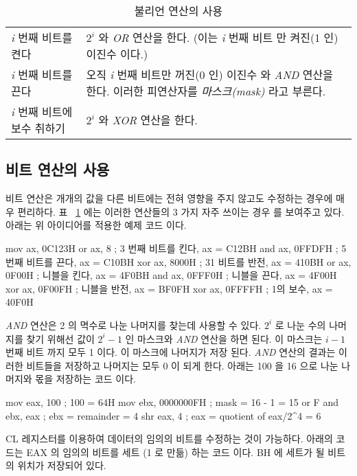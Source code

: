 \begin{table}
\begin{tabular}{lp{3in}}
\emph{i} 번째 비트를 켠다 & $2^i$ 와 \emph{OR} 연산을 한다. (이는 
                              \emph{i} 번째 비트 만 켜진(1 인) 이진수 이다.) \\
\emph{i} 번째 비트를 끈다 & 오직 \emph{i} 번째 비트만 꺼진(0 인) 이진수
                              와 \emph{AND} 연산을 한다. 이러한 피연산자를 
                  	      \emph{마스크(mask)} 라고 부른다.\\
\emph{i} 번째 비트에 보수 취하기 & $2^i$ 와 \emph{XOR} 연산을 한다. 
\end{tabular}
\caption{불리언 연산의 사용 \label{tab:bool}}
\end{table}

\subsection{비트 연산의 사용}
비트 연산은 개개의 값을 다른 비트에는 전혀 영향을 주지 않고도 수정하는 경우에
매우 편리하다. 표 ~\ref{tab:bool} 에는 이러한 연산들의 3 가지 자주 쓰이는 경우
를 보여주고 있다. 아래는 위 아이디어를 적용한 예제 코드 이다. 

\begin{AsmCodeListing}[frame=none]
      mov    ax, 0C123H
      or     ax, 8           ; 3 번째 비트를 킨다,   ax = C12BH
      and    ax, 0FFDFH      ; 5 번째 비트를 끈다,  ax = C10BH
      xor    ax, 8000H       ; 31 비트를 반전,   ax = 410BH
      or     ax, 0F00H       ; 니블을 킨다,  ax = 4F0BH
      and    ax, 0FFF0H      ; 니블을 끈다, ax = 4F00H
      xor    ax, 0F00FH      ; 니블을 반전,  ax = BF0FH
      xor    ax, 0FFFFH      ; 1의 보수,  ax = 40F0H
\end{AsmCodeListing}

\emph{AND} 연산은 2 의 멱수로 나눈 나머지를 찾는데 사용할 수 있다. $2^i$
로 나눈 수의 나머지를 찾기 위해선 값이 $2^i - 1$ 인 마스크와 \emph{AND} 연산을
하면 된다. 이 마스크는 $i-1$ 번째 비트 까지 모두 1 이다. 이 마스크에 나머지가 저장
된다. \emph{AND} 연산의 결과는 이러한 비트들을 저장하고 나머지는 모두 0 이 되게
한다. 아래는 100 을 16 으로 나눈 나머지와 몫을 저장하는 코드 이다. 

\begin{AsmCodeListing}[frame=none]
      mov    eax, 100        ; 100 = 64H
      mov    ebx, 0000000FH  ; mask = 16 - 1 = 15 or F
      and    ebx, eax        ; ebx = remainder = 4
      shr    eax, 4          ; eax = quotient of eax/2^4 = 6
\end{AsmCodeListing}
{\code CL} 레지스터를 이용하여 데이터의 임의의 비트를 수정하는 것이 가능하다.
아래의 코드는 {\code EAX} 의 임의의 비트를 세트 (1 로 만듦) 하는 코드 이다.
{\code BH} 에 세트가 될 비트의 위치가 저장되어 있다. 

